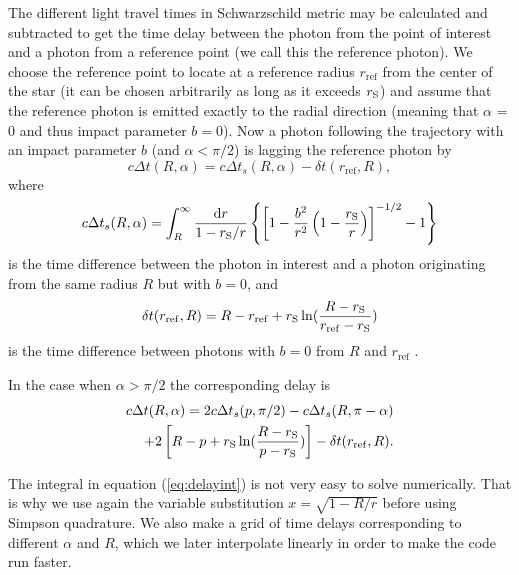 \documentclass{wihuri}
\def\rg{r_{\rm S}} %
\def\be{\begin{equation}}
\def\ee{\end{equation}}
\def\d{{\rm d}}
\def\rg{r_{\rm S}} %
\begin{document}
The different light travel times in Schwarzschild metric may be calculated and subtracted to get the time delay between the photon from the point of interest and a photon from a reference point (we call this the reference photon). We choose the reference point to locate at a reference radius $r_{\mathrm{ref}}$ from the center of the star (it can be chosen arbitrarily as long as it exceeds $\rg$) and assume that the reference photon is emitted exactly to the radial direction (meaning that $\alpha$ = 0 and thus impact parameter $b = 0$). Now a photon following the trajectory with an impact parameter $b$ (and $\alpha < \pi/2$) is lagging the reference photon by 
\cite{pechenick}
\be \label{eq:delay2}
c\Delta t(R,\alpha)=  c\Delta t_{s}(R,\alpha) -\delta t(r_{\mathrm{ref}},R),
\ee
where 
\be \label{eq:delayint}
c\Delta t_{s}(R,\alpha) =
\int_R^{\infty} \frac{\d r}{1- \rg/r}
\left\{ \left[ 1-  \frac{b^2}{r^2}  \left( 1- \frac{\rg}{r} \right)
\right] ^{-1/2}  -1 \right\}
\ee
is the time difference between the photon in interest and a photon originating from the same radius $R$ but with $b=0$, and
\be
\delta t(r_{\mathrm{ref}},R) = R-r_{\mathrm{ref}}+\rg\ln(\frac{R-\rg}{r_{\mathrm{ref}}-\rg})
\ee
is the time difference between photons with $b=0$ from $R$ and $r_{\mathrm{ref}}$ \cite{falkner}. 

In the case when $\alpha > \pi/2$ the corresponding delay is
\be\label{eq:delay22}
\begin{split}
c\Delta t(R,\alpha)= 2c\Delta t_{s}(p,\pi/2)-c\Delta t_{s}(R,\pi-\alpha)\\+2\left[ R-p+\rg\ln(\frac{R-\rg}{p-\rg})\right]-\delta t(r_{\mathrm{ref}},R).
\end{split}
\ee

The integral in equation (\ref{eq:delayint}) is not very easy to solve numerically. That is why we use again the variable substitution $x = \sqrt{1-R/r}$ before using Simpson quadrature. We also make a grid of time delays corresponding to different $\alpha$ and $R$, which we later interpolate linearly in order to make the code run faster.
\end{document}
